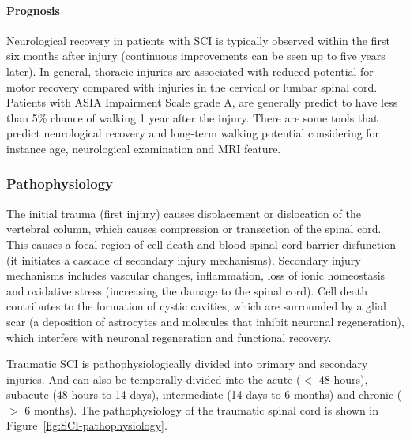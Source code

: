 \documentclass[12pt,article,oneside,a4paper]{memoir}
\begin{document}
\paragraph{Prognosis}
Neurological recovery in patients with SCI is typically observed within the
first six months after injury (continuous improvements can be seen up to five
years later). In general, thoracic injuries are associated with reduced
potential for motor recovery compared with injuries in the cervical or lumbar
spinal cord.
Patients with ASIA Impairment Scale grade A, are generally predict to have less
than 5\% chance of walking 1 year after the injury. There are some tools that
predict neurological recovery and long-term walking potential considering for
instance age, neurological examination and MRI feature.

\subsubsection{Pathophysiology}
The initial trauma (first injury) causes displacement or dislocation of the
vertebral column, which causes compression or transection of the spinal cord.
This causes a focal region of cell death and blood-spinal cord barrier
disfunction (it initiates a cascade of secondary injury mechanisms). Secondary
injury mechanisms includes vascular changes, inflammation, loss of ionic
homeostasis and oxidative stress (increasing the damage to the spinal cord).
Cell death contributes to the formation of cystic cavities, which are
surrounded by a glial scar (a deposition of astrocytes and molecules that
inhibit neuronal regeneration), which interfere with neuronal regeneration and
functional recovery.

Traumatic SCI is pathophysiologically divided into primary and secondary
injuries. And can also be temporally divided into the acute ($<$ 48 hours),
subacute (48 hours to 14 days), intermediate (14 days to 6 months) and chronic
($>$ 6 months). The pathophysiology of the traumatic spinal cord is shown in
Figure~\ref{fig:SCI-pathophysiology}.
\end{document}
